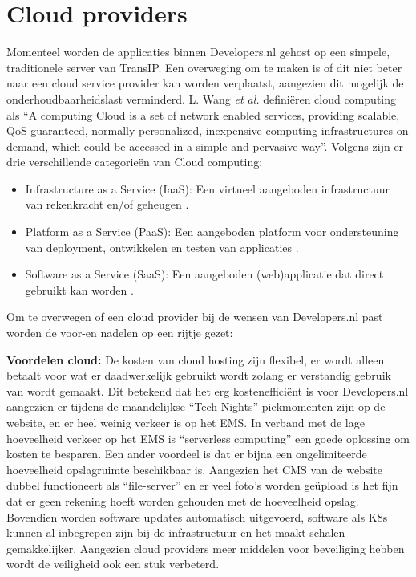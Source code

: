 \section{Cloud providers}

Momenteel worden de applicaties binnen Developers.nl gehost op een simpele, traditionele server van TransIP. Een overweging om te maken is of dit niet beter naar een cloud service provider kan worden verplaatst, aangezien dit mogelijk de onderhoudbaarheidslast verminderd. L. Wang \textit{et al.} \parencite{CloudPerspective} definiëren cloud computing als \enquote{A computing Cloud is a set of network enabled services, providing scalable, QoS guaranteed, normally personalized, inexpensive computing infrastructures on demand, which could be accessed in a simple and pervasive way}. Volgens \parencite{CloudPlatformsIntroduction} zijn er drie verschillende categorieën van Cloud computing:
\begin{itemize}
	\item Infrastructure as a Service (IaaS): Een virtueel aangeboden infrastructuur van rekenkracht en/of geheugen \parencite{CloudComputingAdvantages}.
	\item Platform as a Service (PaaS): Een aangeboden platform voor ondersteuning van deployment, ontwikkelen en testen van applicaties \parencite{TransformingCloud}.
	\item Software as a Service (SaaS): Een aangeboden (web)applicatie dat direct gebruikt kan worden \parencite{CloudComputingAdvantages}.
\end{itemize}

Om te overwegen of een cloud provider bij de wensen van Developers.nl past worden de voor-en nadelen op een rijtje gezet:

\textbf{Voordelen cloud:} De kosten van cloud hosting zijn flexibel, er wordt alleen betaalt voor wat er daadwerkelijk gebruikt wordt zolang er verstandig gebruik van wordt gemaakt. Dit betekend dat het erg kostenefficiënt is voor Developers.nl aangezien er tijdens de maandelijkse \enquote{Tech Nights} piekmomenten zijn op de website, en er heel weinig verkeer is op het EMS. In verband met de lage hoeveelheid verkeer op het EMS is \enquote{serverless computing} een goede oplossing om kosten te besparen. Een ander voordeel is dat er bijna een ongelimiteerde hoeveelheid opslagruimte beschikbaar is. Aangezien het CMS van de website dubbel functioneert als \enquote{file-server} en er veel foto's worden geüpload is het fijn dat er geen rekening hoeft worden gehouden met de hoeveelheid opslag. Bovendien worden software updates automatisch uitgevoerd, software als K8s kunnen al inbegrepen zijn bij de infrastructuur en het maakt schalen gemakkelijker. Aangezien cloud providers meer middelen voor beveiliging hebben wordt de veiligheid ook een stuk verbeterd.

